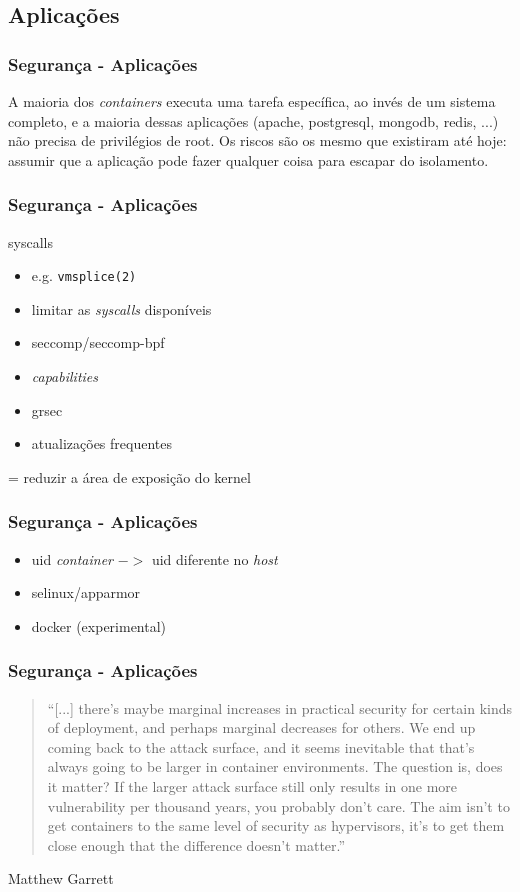 \documentclass{beamer}
\begin{document}
\subsection{Aplicações}

\begin{frame}
    \frametitle{Segurança - Aplicações}
    A maioria dos \textit{containers} executa uma tarefa específica, ao invés
    de um sistema completo, e a maioria dessas aplicações (apache, postgresql,
    mongodb, redis, ...) não precisa de privilégios de root. Os riscos são os
    mesmo que existiram até hoje: assumir que a aplicação pode fazer qualquer
    coisa para escapar do isolamento.
\end{frame}

\begin{frame}
    \frametitle{Segurança - Aplicações}
    syscalls
    \begin{itemize}
        \item e.g. \texttt{vmsplice(2)}
        \item limitar as \textit{syscalls} disponíveis
        \item seccomp/seccomp-bpf
        \item \textit{capabilities}
        \item grsec
        \item atualizações frequentes
    \end{itemize}
    = reduzir a área de exposição do kernel
\end{frame}

\begin{frame}
    \frametitle{Segurança - Aplicações}
    \begin{itemize}
        \item uid \textit{container} $->$ uid diferente no \textit{host}
        \item selinux/apparmor
        \item docker (experimental)
    \end{itemize}
\end{frame}

\begin{frame}
    \frametitle{Segurança - Aplicações}
    \begin{quote}
        ``[...] there's maybe marginal increases in practical security for
        certain kinds of deployment, and perhaps marginal decreases for others.
        We end up coming back to the attack surface, and it seems inevitable
        that that's always going to be larger in container environments. The
        question is, does it matter? If the larger attack surface still only
        results in one more vulnerability per thousand years, you probably
        don't care. The aim isn't to get containers to the same level of
        security as hypervisors, it's to get them close enough that the
        difference doesn't matter.''
    \end{quote}
    Matthew Garrett
\end{frame}
\end{document}
